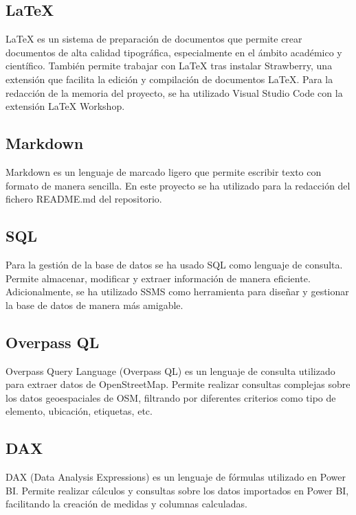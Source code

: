 \subsection{LaTeX}

LaTeX es un sistema de preparación de documentos que permite crear documentos de alta calidad tipográfica, especialmente en el ámbito académico y científico.
También permite trabajar con LaTeX tras instalar Strawberry, una extensión que facilita la edición y compilación de documentos LaTeX.
Para la redacción de la memoria del proyecto, se ha utilizado Visual Studio Code con la extensión LaTeX Workshop.

\subsection{Markdown}

Markdown es un lenguaje de marcado ligero que permite escribir texto con formato de manera sencilla.
En este proyecto se ha utilizado para la redacción del fichero README.md del repositorio.

\subsection{SQL}

Para la gestión de la base de datos se ha usado SQL como lenguaje de consulta.
Permite almacenar, modificar y extraer información de manera eficiente.
Adicionalmente, se ha utilizado SSMS como herramienta para diseñar y gestionar la base de datos de manera más amigable.

\subsection{Overpass QL}
Overpass Query Language (Overpass QL) es un lenguaje de consulta utilizado para extraer datos de OpenStreetMap.
Permite realizar consultas complejas sobre los datos geoespaciales de OSM, filtrando por diferentes criterios como tipo de elemento, ubicación, etiquetas, etc.

\subsection{DAX}

DAX (Data Analysis Expressions) es un lenguaje de fórmulas utilizado en Power BI.
Permite realizar cálculos y consultas sobre los datos importados en Power BI, facilitando la creación de medidas y columnas calculadas.

